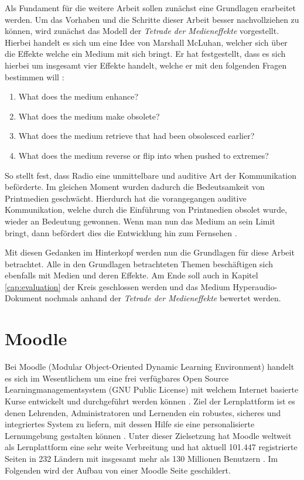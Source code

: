 \label{cha:grundlagen}
Als Fundament für die weitere Arbeit sollen zunächst eine Grundlagen erarbeitet werden. Um das Vorhaben und die Schritte dieser Arbeit besser nachvollziehen zu können, wird zunächst das Modell der \textit{Tetrade der Medieneffekte} vorgestellt. Hierbei handelt es sich um eine Idee von Marshall McLuhan, welcher sich über die Effekte welche ein Medium mit sich bringt. Er hat festgestellt, dass es sich hierbei um insgesamt vier Effekte handelt, welche er mit den folgenden Fragen bestimmen will \citep{mcluhan1977laws}:

\begin{enumerate}
\item What does the medium enhance?
\item What does the medium make obsolete?
\item What does the medium retrieve that had been obsolesced earlier?
\item What does the medium reverse or flip into when pushed to extremes?
\end{enumerate}

So stellt \cite{mcluhan1977laws} fest, dass Radio eine unmittelbare und auditive Art der Kommunikation beförderte. Im gleichen Moment wurden dadurch die Bedeutsamkeit von Printmedien geschwächt. Hierdurch hat die vorangegangen auditive Kommunikation, welche durch die Einführung von Printmedien obsolet wurde, wieder an Bedeutung gewonnen. Wenn man nun das Medium an sein Limit bringt, dann befördert dies die Entwicklung hin zum Fernsehen \citep{mcluhan1977laws}.

Mit diesen Gedanken im Hinterkopf werden nun die Grundlagen für diese Arbeit betrachtet. Alle in den Grundlagen betrachteten Themen beschäftigen sich ebenfalls mit Medien und deren Effekte. Am Ende soll auch in Kapitel \ref{cap:evaluation} der Kreis geschlossen werden und das Medium Hyperaudio-Dokument nochmals anhand der \textit{Tetrade der Medieneffekte} bewertet werden. 




\section{Moodle}
\label{sec:moodle}
Bei Moodle (Modular Object-Oriented Dynamic Learning Environment) handelt es sich im Wesentlichem um eine frei verfügbares Open Source Learningmanagementsystem (GNU Public License) mit welchem Internet basierte Kurse entwickelt und durchgeführt werden können \citep{moodle2015was}. Ziel der Lernplattform ist es denen Lehrenden, Administratoren und Lernenden ein robustes, sicheres und integriertes System zu liefern, mit dessen Hilfe sie eine personalisierte Lernumgebung gestalten können \citep{moodle2018about}. Unter dieser Zielsetzung hat  Moodle weltweit als Lernplattform eine sehr weite Verbreitung und hat aktuell 101.447 registrierte Seiten in 232 Ländern mit insgesamt mehr als 130 Millionen Benutzern \citep{moodle2018stats}. Im Folgenden wird der Aufbau von einer Moodle Seite geschildert.

